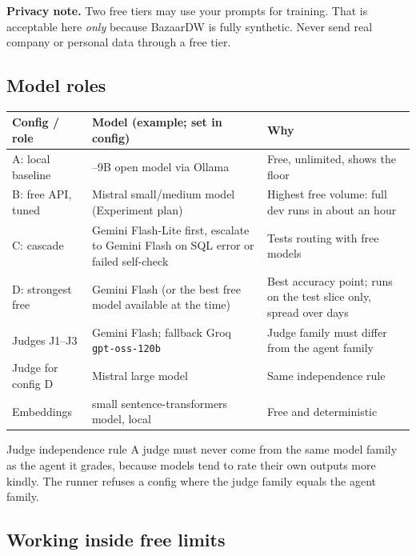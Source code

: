 \documentclass[11pt,a4paper]{article}
\newcommand{\code}[1]{\texttt{\small #1}}
\begin{document}
\textbf{Privacy note.} Two free tiers may use your prompts for training. That is acceptable here
\emph{only} because BazaarDW is fully synthetic. Never send real company or personal data
through a free tier.

\subsection{Model roles}

\begin{center}
\small
\begin{tabularx}{\linewidth}{@{}l >{\raggedright\arraybackslash}X >{\raggedright\arraybackslash}X@{}}
\toprule
\textbf{Config / role} & \textbf{Model (example; set in config)} & \textbf{Why}\\
\midrule
A: local baseline & 7--9B open model via Ollama & Free, unlimited, shows the floor\\
B: free API, tuned & Mistral small/medium model (Experiment plan) & Highest free volume: full dev runs in about an hour\\
C: cascade & Gemini Flash-Lite first, escalate to Gemini Flash on SQL error or failed self-check & Tests routing with free models\\
D: strongest free & Gemini Flash (or the best free model available at the time) & Best accuracy point; runs on the test slice only, spread over days\\
Judges J1--J3 & Gemini Flash; fallback Groq \code{gpt-oss-120b} & Judge family must differ from the agent family\\
Judge for config D & Mistral large model & Same independence rule\\
Embeddings & small sentence-transformers model, local & Free and deterministic\\
\bottomrule
\end{tabularx}
\end{center}

\begin{keybox}{Judge independence rule}
A judge must never come from the same model family as the agent it grades, because models tend
to rate their own outputs more kindly. The runner refuses a config where the judge family equals
the agent family.
\end{keybox}

\subsection{Working inside free limits}
\end{document}
